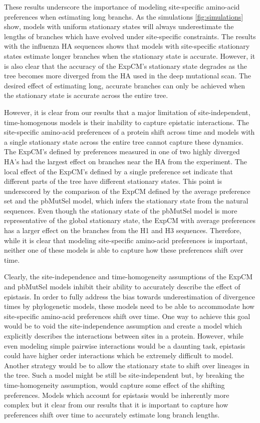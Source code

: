 \documentclass[11pt]{article}
\begin{document}
These results underscore the importance of modeling site-specific amino-acid preferences when estimating long branchs. 
As the simulations \ref{fig:simulations} show, models with uniform stationary states will always underestimate the lengths of branches which have evolved under site-specific constraints. 
The results with the influenza HA sequences shows that models with site-specific stationary states estimate longer branches when the stationary state is accurate. 
However, it is also clear that the accuracy of the ExpCM's stationary state degrades as the tree becomes more diverged from the HA used in the deep mutational scan. 
The desired effect of estimating long, accurate branches can only be achieved when the stationary state is accurate across the entire tree. 

However, it is clear from our results that a major limitation of site-independent, time-homogenous models is their inability to capture epistatic interactions. 
The site-specific amino-acid preferences of a protein shift across time and models with a single stationary state across the entire tree cannot capture these dynamics. 
The ExpCM's defined by preferences measured in one of two highly diverged HA's had the largest effect on branches near the HA from the experiment. 
The local effect of the ExpCM's defined by a single preference set indicate that different parts of the tree have different stationary states. 
This point is underscored by the comparison of the ExpCM defined by the average preference set and the pbMutSel model, which infers the stationary state from the natural sequences. 
Even though the stationary state of the pbMutSel model is more representative of the global stationary state, the ExpCM with average preferences has a larger effect on the branches from the H1 and H3 sequences. 
Therefore, while it is clear that modeling site-specific amino-acid preferences is important, neither one of these models is able to capture how these preferences shift over time.

Clearly, the site-independence and time-homogeneity assumptions of the ExpCM and pbMutSel models inhibit their ability to accurately describe the effect of epistasis.
In order to fully address the bias towards underestimation of divergence times by phylogenetic models, these models need to be able to accommodate how site-specific amino-acid preferences shift over time. 
One way to achieve this goal would be to void the site-independence assumption and create a model which explicitly describes the interactions between sites in a protein. 
However, while even modeling simple pairwise interactions would be a daunting task, epistasis could have higher order interactions which be extremely difficult to model. 
Another strategy would be to allow the stationary state to shift over lineages in the tree. 
Such a model might be still be site-independent but, by breaking the time-homogeneity assumption, would capture some effect of the shifting preferences. 
Models which account for epistasis would be inherently more complex but it clear from our results that it is important to capture how preferences shift over time to accurately estimate long branch lengths.
\end{document}
